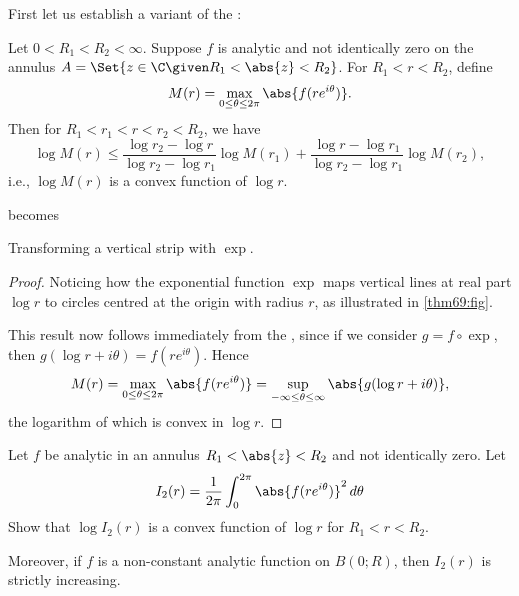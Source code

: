 


First let us establish a variant of the :

\begin{theorem}\label{thm6.9}
	Let $0 < R_1 < R_2 < \infty$.
	Suppose $f$ is analytic and not identically zero on the annulus $A = \Set{z \in \C \given R_1 < \abs{z} < R_2}$.
	For $R_1 < r < R_2$, define
	\[
		M(r) = \max_{0 \leq \theta \leq 2 \pi} \abs{f(r e^{i \theta})}.
	\]
	Then for $R_1 < r_1 < r < r_2 < R_2$, we have
	\[
		\log M(r) \leq \frac{\log r_2 - \log r}{\log r_2 - \log r_1} \log M(r_1) + \frac{\log r - \log r_1}{\log r_2 - \log r_1} \log M(r_2),
	\]
	i.e., $\log M(r)$ is a convex function of $\log r$.
\end{theorem}

\begin{marginfigure}
	\centering

	becomes

	\caption{\label{thm69:fig} Transforming a vertical strip with $\exp$.}
\end{marginfigure}

\begin{proof}
	Noticing how the exponential function $\exp$ maps vertical lines at real part $\log r$ to circles centred at the origin with radius $r$, as illustrated in \autoref{thm69:fig}.

	This result now follows immediately from the , since if we consider $g = f \circ \exp$, then $g(\log r + i \theta) = f(r e^{i \theta})$.
	Hence
	\[
		M(r) = \max_{0 \leq \theta \leq 2 \pi} \abs{f(r e^{i \theta})} = \sup_{-\infty \leq \theta \leq \infty} \abs{g(\log r + i \theta)},
	\]
	the logarithm of which is convex in $\log r$.
\end{proof}

\begin{exercise}
	Let $f$ be analytic in an annulus $R_1 < \abs{z} < R_2$ and not identically zero.
	Let
	\[
		I_2(r) = \frac{1}{2 \pi} \int_0^{2 \pi} \abs{f(r e^{i \theta})}^2 \, d \theta
	\]
	Show that $\log I_2(r)$ is a convex function of $\log r$ for $R_1 < r < R_2$.

	Moreover, if $f$ is a non-constant analytic function on $B(0; R)$, then $I_2(r)$ is strictly increasing.
\end{exercise}

